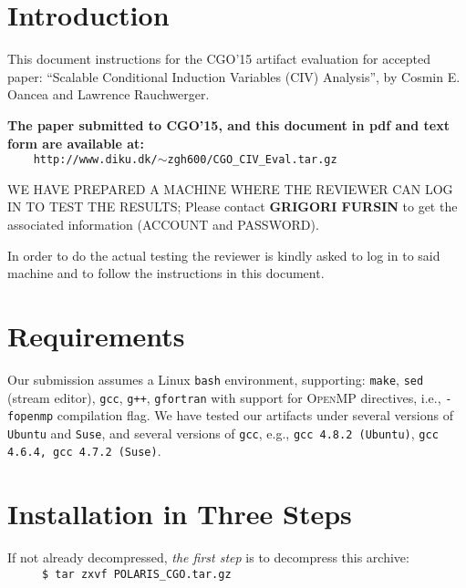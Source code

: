 \documentclass{sig-alternate}
\begin{document}




\newpage
\section{Introduction} 

This document instructions for the CGO'15 artifact evaluation for accepted paper: 
``Scalable Conditional Induction Variables (CIV) Analysis'', by Cosmin E. Oancea 
and Lawrence Rauchwerger.

{\bf The paper submitted to CGO'15, and this document in pdf and text form
are available at:}\\ 
{\tt~~~~http://www.diku.dk/$\sim$zgh600/CGO\_CIV\_Eval.tar.gz}
\vspace{1ex}

WE HAVE PREPARED A MACHINE WHERE THE REVIEWER CAN LOG IN TO
TEST THE RESULTS; Please contact {\bf GRIGORI FURSIN} to get the
associated information (ACCOUNT and PASSWORD).

In order to do the actual testing the reviewer is kindly asked to
log in to said machine and to follow the instructions in this document.

\section{Requirements}

Our submission assumes a Linux {\tt bash} environment, supporting: 
{\tt make}, {\tt sed} (stream editor), {\tt gcc}, {\tt g++}, {\tt gfortran} 
with support for \textsc{OpenMP} directives, i.e., {\tt -fopenmp} compilation flag.
We have tested our artifacts under several versions of {\tt Ubuntu} and {\tt Suse}, 
and several versions of {\tt gcc}, e.g., {\tt gcc 4.8.2 (Ubuntu)}, {\tt gcc 4.6.4, gcc 4.7.2 (Suse)}.  


\section{Installation in Three Steps}

If not already decompressed, {\em the first step} is to decompress this archive:\\
$\mbox{ }${\tt~~~~\$ tar zxvf POLARIS\_CGO.tar.gz}\vspace{1ex}
\end{document}
